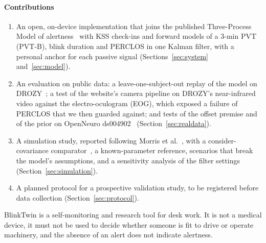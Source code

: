 \paragraph*{Contributions}
\begin{enumerate}
  \item An open, on-device implementation that joins the published Three-Process Model of alertness~\cite{akerstedt2004predictions,akerstedt2008accounting,ingre2014validating} with KSS check-ins and forward models of a 3-min PVT (PVT-B), blink duration and PERCLOS in one Kalman filter, with a personal anchor for each passive signal (Sections~\ref{sec:system} and~\ref{sec:model}).
  \item An evaluation on public data: a leave-one-subject-out replay of the model on DROZY~\cite{massoz2016ulg}; a test of the website's camera pipeline on DROZY's near-infrared video against the electro-oculogram (EOG), which exposed a failure of PERCLOS that we then guarded against; and tests of the offset premise and of the prior on OpenNeuro ds004902~\cite{xiang2024resting} (Section~\ref{sec:realdata}).
  \item A simulation study, reported following Morris et al.~\cite{morris2019using}, with a consider-covariance comparator~\cite{schmidt1966application}, a known-parameter reference, scenarios that break the model's assumptions, and a sensitivity analysis of the filter settings (Section~\ref{sec:simulation}).
  \item A planned protocol for a prospective validation study, to be registered before data collection (Section~\ref{sec:protocol}).
\end{enumerate}

BlinkTwin is a self-monitoring and research tool for desk work. It is not a medical device, it must not be used to decide whether someone is fit to drive or operate machinery, and the absence of an alert does not indicate alertness.
